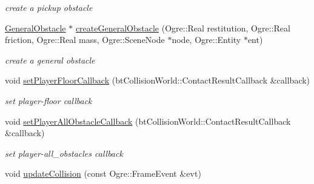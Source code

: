 \begin{DoxyCompactItemize}
\begin{DoxyCompactList}\small\item\em create a pickup obstacle \end{DoxyCompactList}\item 
\hyperlink{class_n_c_t_u_1_1_general_obstacle}{General\+Obstacle} $\ast$ \hyperlink{class_n_c_t_u_1_1_obstacle_manager_ac0865d03940bcc60aba170a3070def8d}{create\+General\+Obstacle} (Ogre\+::\+Real restitution, Ogre\+::\+Real friction, Ogre\+::\+Real mass, Ogre\+::\+Scene\+Node $\ast$node, Ogre\+::\+Entity $\ast$ent)\hypertarget{class_n_c_t_u_1_1_obstacle_manager_ac0865d03940bcc60aba170a3070def8d}{}\label{class_n_c_t_u_1_1_obstacle_manager_ac0865d03940bcc60aba170a3070def8d}

\begin{DoxyCompactList}\small\item\em create a general obstacle \end{DoxyCompactList}\item 
void \hyperlink{class_n_c_t_u_1_1_obstacle_manager_a9515930be3955052fca23e4826f17565}{set\+Player\+Floor\+Callback} (bt\+Collision\+World\+::\+Contact\+Result\+Callback \&callback)\hypertarget{class_n_c_t_u_1_1_obstacle_manager_a9515930be3955052fca23e4826f17565}{}\label{class_n_c_t_u_1_1_obstacle_manager_a9515930be3955052fca23e4826f17565}

\begin{DoxyCompactList}\small\item\em set player-\/floor callback \end{DoxyCompactList}\item 
void \hyperlink{class_n_c_t_u_1_1_obstacle_manager_adbcd798a63e0ea31250c9cd02ae7c8e0}{set\+Player\+All\+Obstacle\+Callback} (bt\+Collision\+World\+::\+Contact\+Result\+Callback \&callback)\hypertarget{class_n_c_t_u_1_1_obstacle_manager_adbcd798a63e0ea31250c9cd02ae7c8e0}{}\label{class_n_c_t_u_1_1_obstacle_manager_adbcd798a63e0ea31250c9cd02ae7c8e0}

\begin{DoxyCompactList}\small\item\em set player-\/all\+\_\+obstacles callback \end{DoxyCompactList}\item 
void \hyperlink{class_n_c_t_u_1_1_obstacle_manager_abc303dbfc06ae04ab42631806721940e}{update\+Collision} (const Ogre\+::\+Frame\+Event \&evt)\hypertarget{class_n_c_t_u_1_1_obstacle_manager_abc303dbfc06ae04ab42631806721940e}{}\label{class_n_c_t_u_1_1_obstacle_manager_abc303dbfc06ae04ab42631806721940e}


\end{DoxyCompactItemize}
